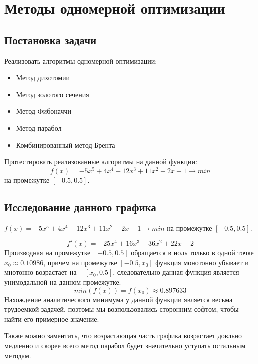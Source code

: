 \chapter{Методы одномерной оптимизации}
\section{Постановка задачи}
Реализовать алгоритмы одномерной оптимизации:

\begin{itemize}
	\item 	Метод дихотомии
	\item 	Метод золотого сечения
	\item	Метод Фибоначчи
	\item 	Метод парабол
	\item 	Комбинированный метод Брента
\end{itemize}

Протестировать реализованные алгоритмы на данной функции:
$$f(x) = -5x^5 + 4x^4 - 12x^3 + 11x^2 - 2x + 1 \rightarrow min$$ на промежутке $[-0.5, 0.5]$.

\section{Исследование данного графика}

$f(x) = -5x^5 + 4x^4 - 12x^3 + 11x^2 - 2x + 1 \rightarrow min$ на промежутке $[-0.5, 0.5]$.

$$f'(x) = -25x^4 + 16x^3 - 36x^2 + 22x - 2$$
Производная на промежутке $[-0.5, 0.5]$ обращается в ноль только в одной точке $x_0 \approx 0.10986$, причем на промежутке $[-0.5, x_0]$ функция монотонно убывает и мнотонно возрастает на -- $[x_0, 0.5]$, следовательно данная функция является унимодальной на данном промежутке.
$$min(f(x)) = f(x_0) \approx 0.897633$$
Нахождение аналитического минимума у данной функции является весьма трудоемкой задачей, поэтомы мы возпользовались сторонним софтом, чтобы найти его примерное значение.

Также можно заментить, что возрастающая часть графика возрастает довльно медленно и скорее всего 
метод парабол будет значительно уступать остальным методам.


